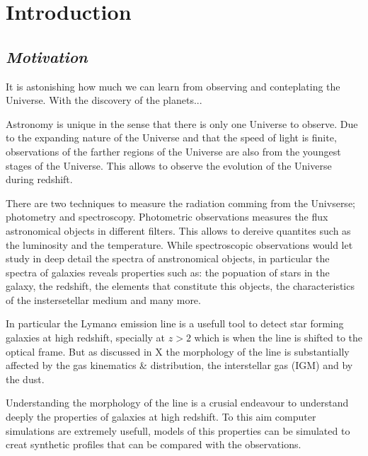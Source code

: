 
\chapter{Introduction} %

\label{sec:intro} %


\section{\emph{Motivation}}

It is astonishing how much we can learn from observing and 
conteplating the Universe. With the discovery of the planets...

Astronomy is unique in the sense that there is only one Universe 
to observe. Due to the expanding nature of the Universe and 
that the speed of light is finite, observations of the farther 
regions of the Universe are also from the youngest stages of the Universe.
This allows to observe the evolution of the Universe during redshift.

There are two techniques to measure the radiation comming from the Univserse; photometry and spectroscopy. Photometric observations measures the flux astronomical objects in different filters. This allows to dereive quantites such as the luminosity and the temperature. While spectroscopic observations would let study in deep detail
the spectra of anstronomical objects, in particular the spectra of 
galaxies reveals properties such as: the popuation of stars in the galaxy, the
redshift, the elements that constitute this objects, the characteristics 
of the instersetellar medium and many more.

In particular the Lyman$\alpha$ emission line is a usefull 
tool to detect star forming galaxies at high redshift, specially 
at $z>2$ which is when the line is shifted to the optical frame. But 
as discussed in X the morphology of the line is substantially affected
by the gas kinematics \& distribution, the interstellar gas (IGM)
 and by the dust. 

Understanding the morphology of the \ly line is a crusial endeavour 
to understand deeply the properties of galaxies at high redshift. To this aim 
computer simulations are extremely usefull, models of this properties 
can be simulated to creat synthetic profiles that can be compared
with the observations. 

